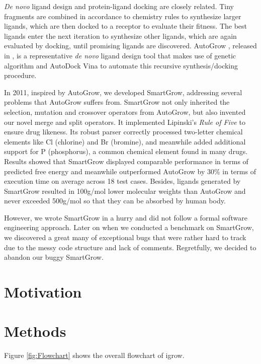 \documentclass[10pt, conference, compsocconf]{IEEEtran}
\begin{document}
\textit{De novo} ligand design and protein-ligand docking are closely related. Tiny fragments are combined in accordance to chemistry rules to synthesize larger ligands, which are then docked to a receptor to evaluate their fitness. The best ligands enter the next iteration to synthesize other ligands, which are again evaluated by docking, until promising ligands are discovered. AutoGrow \citep{466}, released in \citeyear{466}, is a representative \textit{de novo} ligand design tool that makes use of genetic algorithm and AutoDock Vina \citep{595} to automate this recursive synthesis/docking procedure.

In 2011, inspired by AutoGrow, we developed SmartGrow, addressing several problems that AutoGrow suffers from. SmartGrow not only inherited the selection, mutation and crossover operators from AutoGrow, but also invented our novel merge and split operators. It implemented Lipinski's \textit{Rule of Five} \citep{168} to ensure drug likeness. Its robust parser correctly processed two-letter chemical elements like Cl (chlorine) and Br (bromine), and meanwhile added additional support for P (phosphorus), a common chemical element found in many drugs. Results showed that SmartGrow displayed comparable performance in terms of predicted free energy and meanwhile outperformed AutoGrow by 30\% in terms of execution time on average across 18 test cases. Besides, ligands generated by SmartGrow resulted in 100g/mol lower molecular weights than AutoGrow and never exceeded 500g/mol so that they can be absorbed by human body.

However, we wrote SmartGrow in a hurry and did not follow a formal software engineering approach. Later on when we conducted a benchmark on SmartGrow, we discovered a great many of exceptional bugs that were rather hard to track due to the messy code structure and lack of comments. Regretfully, we decided to abandon our buggy SmartGrow.

\section{Motivation}



\section{Methods}

Figure \ref{fig:Flowchart} shows the overall flowchart of igrow. 
\end{document}
